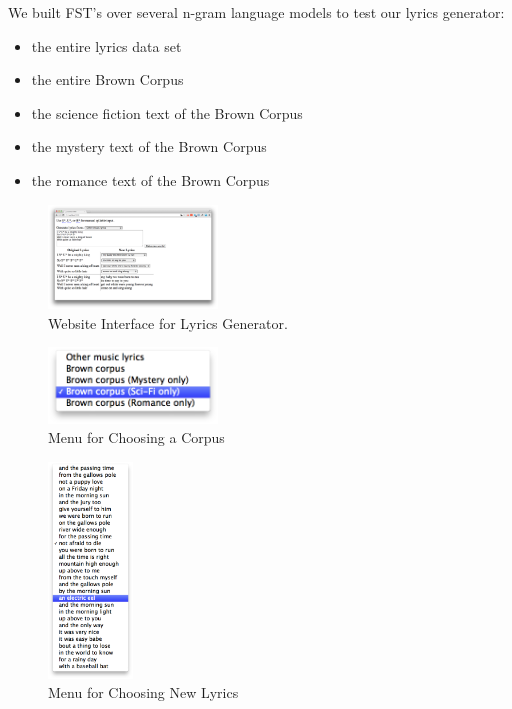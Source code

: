\documentclass{vgtc}                          %
\begin{document}
We built FST's over several n-gram language models to test our lyrics generator:
\begin{itemize}
  \item the entire lyrics data set
  \item the entire Brown Corpus
  \item the science fiction text of the Brown Corpus
  \item the mystery text of the Brown Corpus
  \item the romance text of the Brown Corpus
\end{itemize}


\begin{figure}%
\centering
\includegraphics[width=0.4\textwidth]{images/png/lion_king2.png}
\caption{Website Interface for Lyrics Generator.}
\label{fig:interface}
\end{figure}

\begin{figure}%
\centering
\includegraphics[width=0.4\textwidth]{images/png/choose_corpus.png}
\caption{Menu for Choosing a Corpus}
\label{fig:corpus-menu}
\end{figure}

\begin{figure}%
\centering
\includegraphics[width=0.2\textwidth]{images/png/choose_lyrics_menu.png}
\caption{Menu for Choosing New Lyrics}
\label{fig:lyrics-menu}
\end{figure}
\end{document}
